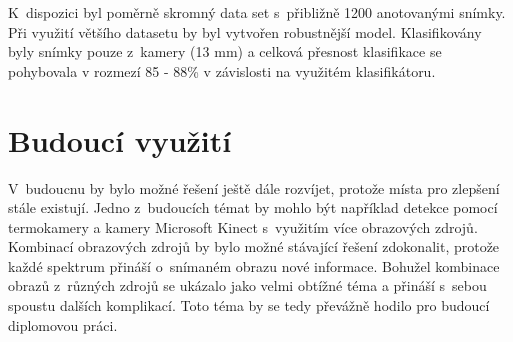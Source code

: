 K~dispozici byl poměrně skromný data set s~přibližně 1200 anotovanými snímky. Při využití většího datasetu by byl vytvořen robustnější model. Klasifikovány byly snímky pouze z~kamery (13 mm) a celková přesnost klasifikace se pohybovala v rozmezí 85 - 88\% v závislosti na využitém klasifikátoru.

\section{Budoucí využití}
V~budoucnu by bylo možné řešení ještě dále rozvíjet, protože místa pro zlepšení stále existují. Jedno z~budoucích témat by mohlo být například detekce pomocí termokamery a kamery Microsoft Kinect s~využitím více obrazových zdrojů. Kombinací obrazových zdrojů by bylo možné stávající řešení zdokonalit, protože každé spektrum přináší o~snímaném obrazu nové informace. Bohužel kombinace obrazů z~různých zdrojů se ukázalo jako velmi obtížné téma a přináší s~sebou spoustu dalších komplikací. Toto téma by se tedy převážně hodilo pro budoucí diplomovou práci.